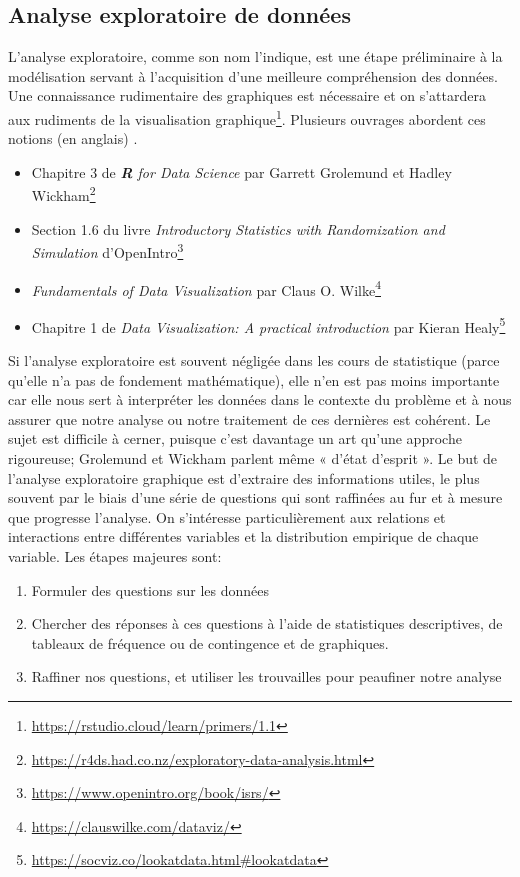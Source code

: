 \documentclass[
  11pt,
  letterpaper,
]{article}
\providecommand{\tightlist}{%
  \setlength{\itemsep}{0pt}\setlength{\parskip}{0pt}}
\renewcommand{\href}[2]{#2\footnote{\url{#1}}}
\theoremstyle{definition}
\theoremstyle{definition}
\theoremstyle{definition}
\theoremstyle{definition}
\theoremstyle{remark}
\begin{document}
\hypertarget{analyse-exploratoire}{%
\subsection{Analyse exploratoire de données}\label{analyse-exploratoire}}

L'analyse exploratoire, comme son nom l'indique, est une étape préliminaire à la modélisation servant à l'acquisition d'une meilleure compréhension des données.
Une connaissance rudimentaire des graphiques est nécessaire et on s'attardera aux \href{https://rstudio.cloud/learn/primers/1.1}{rudiments de la visualisation graphique}. Plusieurs ouvrages abordent ces notions (en anglais) .

\begin{itemize}
\tightlist
\item
  \href{https://r4ds.had.co.nz/exploratory-data-analysis.html}{Chapitre 3 de \emph{\textbf{R} for Data Science} par Garrett Grolemund et Hadley Wickham}
\item
  \href{https://www.openintro.org/book/isrs/}{Section 1.6 du livre \emph{Introductory Statistics with Randomization and Simulation} d'OpenIntro}
\item
  \href{https://clauswilke.com/dataviz/}{\emph{Fundamentals of Data Visualization} par Claus O. Wilke}
\item
  \href{https://socviz.co/lookatdata.html\#lookatdata}{Chapitre 1 de \emph{Data Visualization: A practical introduction} par Kieran Healy}
\end{itemize}

Si l'analyse exploratoire est souvent négligée dans les cours de statistique (parce qu'elle n'a pas de fondement mathématique), elle n'en est pas moins importante car elle nous sert à interpréter les données dans le contexte du problème et à nous assurer que notre analyse ou notre traitement de ces dernières est cohérent. Le sujet est difficile à cerner, puisque c'est davantage un art qu'une approche rigoureuse; Grolemund et Wickham parlent même « d'état d'esprit ». Le but de l'analyse exploratoire graphique est d'extraire des informations utiles, le plus souvent par le biais d'une série de questions qui sont raffinées au fur et à mesure que progresse l'analyse. On s'intéresse particulièrement aux relations et interactions entre différentes variables et la distribution empirique de chaque variable. Les étapes majeures sont:

\begin{enumerate}
\def\labelenumi{\arabic{enumi}.}
\tightlist
\item
  Formuler des questions sur les données
\item
  Chercher des réponses à ces questions à l'aide de statistiques descriptives, de tableaux de fréquence ou de contingence et de graphiques.
\item
  Raffiner nos questions, et utiliser les trouvailles pour peaufiner notre analyse
\end{enumerate}
\end{document}
